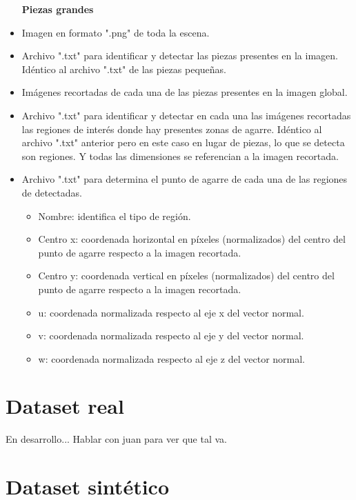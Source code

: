 \noindent
\begin{itemize}[wide, nosep, labelindent = 0pt, topsep = 1ex]
\item[\textbf{Piezas grandes}]
\item Imagen en formato ".png" de toda la escena.
\item Archivo ".txt" para identificar y detectar las piezas presentes en la imagen. Idéntico al archivo ".txt" de las piezas pequeñas.
\item Imágenes recortadas de cada una de las piezas presentes en la imagen global.
\item Archivo ".txt" para identificar y detectar en cada una las imágenes recortadas las regiones de interés donde hay presentes zonas de agarre. Idéntico al archivo ".txt" anterior pero en este caso en lugar de piezas, lo que se detecta son regiones. Y todas las dimensiones se referencian a la imagen recortada.
\item Archivo ".txt" para determina el punto de agarre de cada una de las regiones de  detectadas.
\begin{itemize}
\item Nombre: identifica el tipo de región.
\item Centro x: coordenada horizontal en píxeles (normalizados) del centro del punto de agarre respecto a la imagen recortada.
\item Centro y: coordenada vertical en píxeles (normalizados) del centro del punto de agarre respecto a la imagen recortada.
\item u: coordenada normalizada respecto al eje x del vector normal.
\item v: coordenada normalizada respecto al eje y del vector normal.
\item w: coordenada normalizada respecto al eje z del vector normal.
\end{itemize}
\end{itemize}

\section{Dataset real}
\label{chap:Generación de un dataset sec:dataset real}
En desarrollo... Hablar con juan para ver que tal va.

\section{Dataset sintético}
\label{chap:Generación de un dataset sec:Dataset sintético}

